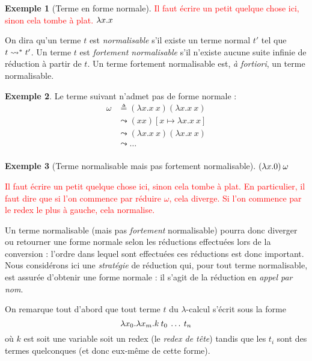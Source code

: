 \documentclass {article}
\theoremstyle{definition}
\newtheorem{example}{Exemple}
\theoremstyle{remark}
\newcommand{\todo}[1]{\textcolor{red}{#1}}
\begin{document}
\begin{example}[Terme en forme normale] \todo{Il faut écrire un petit quelque chose ici, sinon cela tombe à plat.}
  \(\lambda x. x\)
\end{example}

On dira qu'un terme \(t\) est \emph{normalisable} s'il existe un terme
normal \(t'\) tel que \(t \leadsto^{*} t'\). Un terme \(t\) est
\emph{fortement normalisable} s'il n'existe aucune suite infinie de
réduction à partir de \(t\). Un terme fortement normalisable est,
\textit{à fortiori}, un terme normalisable.

\begin{example}
 \label{paradoxe}
  Le terme suivant n'admet pas de forme normale :
  \begin{align*}
    \omega &\triangleq (\lambda x. x\: x) (\lambda x. x\: x) \\
           &\leadsto (x x)[x \mapsto \lambda x. x\: x] \\
           &\leadsto (\lambda x. x\: x) (\lambda x. x\: x) \\
           &\leadsto \ldots \\
  \end{align*}
\end{example}

\begin{example}[Terme normalisable mais pas fortement normalisable]
  \label{ex:divergence}
  \((\lambda x. 0)\:\omega\)

\todo{Il faut écrire un petit quelque chose ici, sinon cela tombe à
  plat. En particulier, il faut dire que si l'on commence par réduire
  $\omega$, cela diverge. Si l'on commence par le redex le plus à
  gauche, cela normalise.}

\end{example}

Un terme normalisable (mais pas \emph{fortement} normalisable) pourra
donc diverger ou retourner une forme normale selon les réductions
effectuées lors de la conversion : l'ordre dans lequel sont effectuées
ces réductions est donc important. Nous considérons ici une
\emph{stratégie} de réduction qui, pour tout terme normalisable, est assurée d'obtenir une forme
normale : il s'agit de la réduction en
\emph{appel par nom}.

On remarque tout d'abord que tout terme \(t\) du \(\lambda\)-calcul
s'écrit sous la forme
%
\[
\lambda x_0. \lambda x_m. k\:t_0\:\ldots\:t_n
\]
%
où \(k\) est soit une variable soit un redex (le \emph{redex de tête})
tandis que les \(t_i\) sont des termes quelconques (et donc eux-même
de cette forme).
\end{document}
